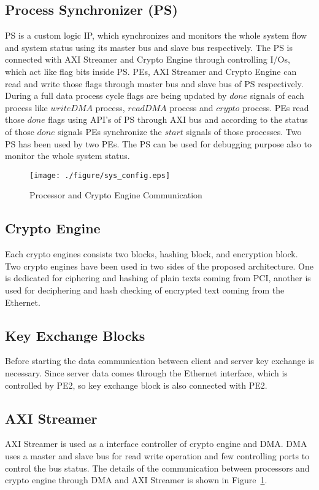 \documentclass[3p,times]{elsarticle}
\begin{document}
\subsection{Process  Synchronizer (PS)}
PS is a custom logic IP, which synchronizes and monitors the whole system flow and system status using its master bus and slave bus respectively. The PS is connected with AXI Streamer and Crypto Engine through controlling I/Os, which act like flag bits inside PS.
PEs, AXI Streamer and Crypto Engine can read and write those flags through master bus and slave bus of PS respectively. During a full data process cycle flags are being updated by $done$ signals of each process like $write DMA$ process, $read DMA$ process and $crypto$ process. PEs read those $done$ flags using API's of PS through AXI bus and according to the status of those $done$ signals PEs synchronize the $start$ signals of those processes. Two PS has been used by two PEs. The PS can be used for debugging purpose also to monitor the whole system status.



\begin{figure}[!hp]
\centering
\texttt{[image: ./figure/sys\_config.eps]}
\vspace{-6pt}
\caption{Processor and Crypto Engine Communication}
\vspace{-8pt}
\label{fig:sys_config_fig}
\end{figure}
\subsection{Crypto Engine}
Each crypto engines consists two blocks, hashing block, and encryption block. Two crypto engines have been used in two sides of the proposed architecture. One is dedicated for ciphering and hashing of plain texts coming from PCI, another is used for deciphering and hash checking of encrypted text coming from the Ethernet. 
\vspace{-10pt}
\subsection{Key Exchange Blocks}
Before starting the data communication between client and server key exchange is necessary. Since server data comes through the Ethernet interface, which is controlled by PE2, so key exchange block is also connected with PE2.
\vspace{-10pt}
\subsection{AXI Streamer}
AXI Streamer is used as a interface controller of crypto engine and DMA. DMA uses a master and slave bus for read write operation and few controlling ports to control the bus status. The details of the communication between processors and crypto engine through DMA and AXI Streamer is shown in Figure~\ref{fig:sys_config_fig}.\\  
\vspace{-10pt}
\end{document}
